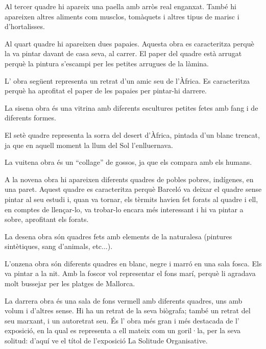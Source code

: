 \begin{news}
Al tercer quadre hi apareix una paella amb arròs real enganxat. També hi apareixen altres aliments com musclos, tomàquets i altres tipus de marisc i d’hortalisses. 

Al quart quadre hi apareixen dues papaies. Aquesta obra es caracteritza perquè la va pintar davant de casa seva, al carrer. El paper del quadre està arrugat perquè la pintura s’escampi per les petites arrugues de la làmina.

L’ obra següent representa un retrat d’un amic seu de l’Àfrica. Es caracteritza perquè ha aprofitat el paper de les papaies per pintar-hi darrere.
 
La sisena obra és una vitrina amb diferents escultures petites fetes amb fang i de diferents formes.

El setè quadre representa la sorra del desert d’Àfrica, pintada d’un blanc trencat, ja que en aquell moment la llum del Sol l’enlluernava.

La vuitena obra és un “collage” de gossos, ja que els compara amb els humans.

A la novena obra hi apareixen diferents quadres de pobles pobres, indígenes, en una paret. Aquest quadre es caracteritza perquè Barceló va deixar el quadre sense pintar al seu estudi i,  quan va tornar, els tèrmits havien fet forats al quadre i ell, en comptes de llençar-lo, va trobar-lo encara més interessant i hi va pintar a sobre, aprofitant els forats.

La desena obra són quadres fets amb elements de la naturalesa (pintures sintètiques, sang d'animals, etc...).

L’onzena obra són diferents quadres en blanc, negre i marró en una sala fosca. Els va pintar a la nit. Amb la foscor vol representar el fons marí, perquè li agradava molt bussejar per les platges de Mallorca.

La darrera obra és una sala de fons vermell amb diferents quadres, uns amb volum i d’altres sense. Hi ha un retrat de la seva biògrafa; també un retrat del seu marxant, i un autoretrat seu. És l’ obra més gran i més destacada de l’ exposició, en la qual es representa a ell mateix com un goril·la, per la seva solitud: d’aquí ve el títol de l’exposició La Solitude Organisative.

\end{news}
